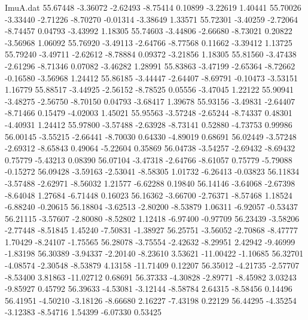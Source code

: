 \begin{filecontents}{ImuA.dat}
  55.67448   -3.36072   -2.62493   -8.75414    0.10899   -3.22619    1.40441
  55.70026   -3.33440   -2.71226   -8.70270   -0.01314   -3.38649    1.33571
  55.72301   -3.40259   -2.72064   -8.74457    0.04793   -3.43992    1.18305
  55.74603   -3.44806   -2.66680   -8.73021    0.20822   -3.56968    1.06092
  55.76920   -3.49113   -2.64766   -8.77568    0.11662   -3.39412    1.13725
  55.79240   -3.49711   -2.62612   -8.78884    0.09372   -3.21856    1.18305
  55.81560   -3.47438   -2.61296   -8.71346    0.07082   -3.46282    1.28991
  55.83863   -3.47199   -2.65364   -8.72662   -0.16580   -3.56968    1.24412
  55.86185   -3.44447   -2.64407   -8.69791   -0.10473   -3.53151    1.16779
  55.88517   -3.44925   -2.56152   -8.78525    0.05556   -3.47045    1.22122
  55.90941   -3.48275   -2.56750   -8.70150    0.04793   -3.68417    1.39678
  55.93156   -3.49831   -2.64407   -8.71466    0.15479   -4.02003    1.45021
  55.95563   -3.57248   -2.65244   -8.74337    0.48301   -4.40931    1.24412
  55.97800   -3.57488   -2.63928   -8.73141    0.52880   -4.73753    0.99986
  56.00145   -3.55215   -2.66441   -8.70030    0.64330   -4.89019    0.68691
  56.02449   -3.57248   -2.69312   -8.65843    0.49064   -5.22604    0.35869
  56.04738   -3.54257   -2.69432   -8.69432    0.75779   -5.43213    0.08390
  56.07104   -3.47318   -2.64766   -8.61057    0.75779   -5.79088   -0.15272
  56.09428   -3.59163   -2.53041   -8.58305    1.01732   -6.26413   -0.03823
  56.11834   -3.57488   -2.62971   -8.56032    1.21577   -6.62288    0.19840
  56.14146   -3.64068   -2.67398   -8.64048    1.27684   -6.71448    0.16023
  56.16362   -3.66700   -2.76371   -8.57468    1.18524   -6.88240   -0.20615
  56.18804   -3.62513   -2.80200   -8.53879    1.06311   -6.92057   -0.53437
  56.21115   -3.57607   -2.80080   -8.52802    1.12418   -6.97400   -0.97709
  56.23439   -3.58206   -2.77448   -8.51845    1.45240   -7.50831   -1.38927
  56.25751   -3.56052   -2.70868   -8.47777    1.70429   -8.24107   -1.75565
  56.28078   -3.75554   -2.42632   -8.29951    2.42942   -9.46999   -1.83198
  56.30389   -3.94337   -2.20140   -8.23610    3.53621  -11.00422   -1.10685
  56.32701   -4.08574   -2.30548   -8.53879    4.13158  -11.71409    0.12207
  56.35012   -4.21735   -2.57707   -8.53400    3.81863  -11.02712    0.68691
  56.37333   -4.30828   -2.89771   -8.45982    3.03243   -9.85927    0.45792
  56.39633   -4.53081   -3.12144   -8.58784    2.64315   -8.58456    0.14496
  56.41951   -4.50210   -3.18126   -8.66680    2.16227   -7.43198    0.22129
  56.44295   -4.35254   -3.12383   -8.54716    1.54399   -6.07330    0.53425

\end{filecontents}
